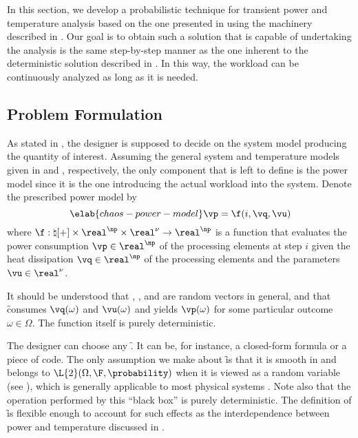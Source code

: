 In this section, we develop a probabilistic technique for transient power and
temperature analysis based on the one presented in
 using the machinery described in
. Our goal is to obtain such a solution that is
capable of undertaking the analysis is the same step-by-step manner as the one
inherent to the deterministic solution described in
. In this way, the workload can be continuously
analyzed as long as it is needed.

\subsection{Problem Formulation}

As stated in , the designer is supposed to
decide on the system model producing the quantity of interest. Assuming the
general system and temperature models given in  and
, respectively, the only component that is left to
define is the power model since it is the one introducing the actual workload
into the system. Denote the prescribed power model by
\begin{equation} \elab{chaos-power-model}
  \vp = \f(i, \vq, \vu)
\end{equation}
where $\f: \natural[+] \times \real^\np \times \real^\nu \to \real^\np$ is a
function that evaluates the power consumption $\vp \in \real^\np$ of the
processing elements at step $i$ given the heat dissipation $\vq \in \real^\np$
of the processing elements and the parameters $\vu \in \real^\nu$.

\begin{remark}
It should be understood that \vp, \vq, and \vu are random vectors in general,
and that \f consumes $\vq(\omega)$ and $\vu(\omega)$ and yields $\vp(\omega)$
for some particular outcome $\omega \in \Omega$. The function itself is purely
deterministic.
\end{remark}

The designer can choose any \f. It can be, for instance, a closed-form formula
or a piece of code. The only assumption we make about \f is that it is smooth in
\vz and belongs to $\L{2}(\Omega, \F, \probability)$ when it is viewed as a
random variable (see ), which is generally applicable
to most physical systems \cite{xiu2010}. Note also that the operation performed
by this ``black box'' is purely deterministic. The definition of \f is flexible
enough to account for such effects as the interdependence between power and
temperature discussed in .


